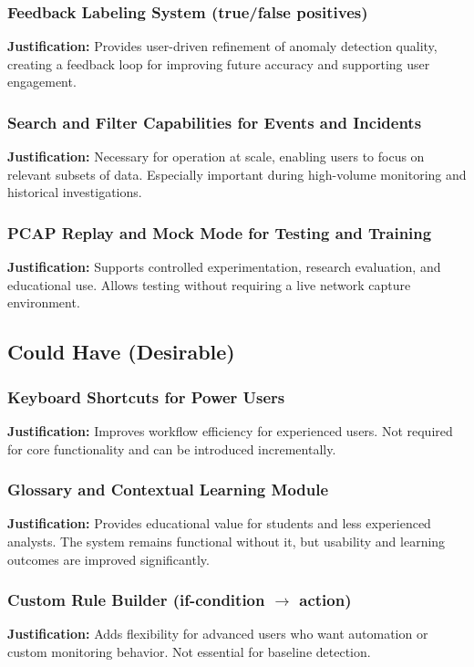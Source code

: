 \documentclass[
    11pt, 
    a4paper, 
    parskip=half, 
    headsepline,       %
    DIV=12             %
]{scrartcl}
\begin{document}
\subsubsection*{Feedback Labeling System (true/false positives)}
\noindent\textbf{Justification:}
Provides user-driven refinement of anomaly detection quality, creating a feedback loop for improving future accuracy and supporting user engagement.

\subsubsection*{Search and Filter Capabilities for Events and Incidents}
\noindent\textbf{Justification:}
Necessary for operation at scale, enabling users to focus on relevant subsets of data. Especially important during high-volume monitoring and historical investigations.

\subsubsection*{PCAP Replay and Mock Mode for Testing and Training}
\noindent\textbf{Justification:}
Supports controlled experimentation, research evaluation, and educational use. Allows testing without requiring a live network capture environment.

\subsection{Could Have (Desirable)}

\subsubsection*{Keyboard Shortcuts for Power Users}
\noindent\textbf{Justification:}
Improves workflow efficiency for experienced users. Not required for core functionality and can be introduced incrementally.

\subsubsection*{Glossary and Contextual Learning Module}
\noindent\textbf{Justification:}
Provides educational value for students and less experienced analysts. The system remains functional without it, but usability and learning outcomes are improved significantly.

\subsubsection*{Custom Rule Builder (if-condition $\rightarrow$ action)}
\noindent\textbf{Justification:}
Adds flexibility for advanced users who want automation or custom monitoring behavior. Not essential for baseline detection.
\end{document}
